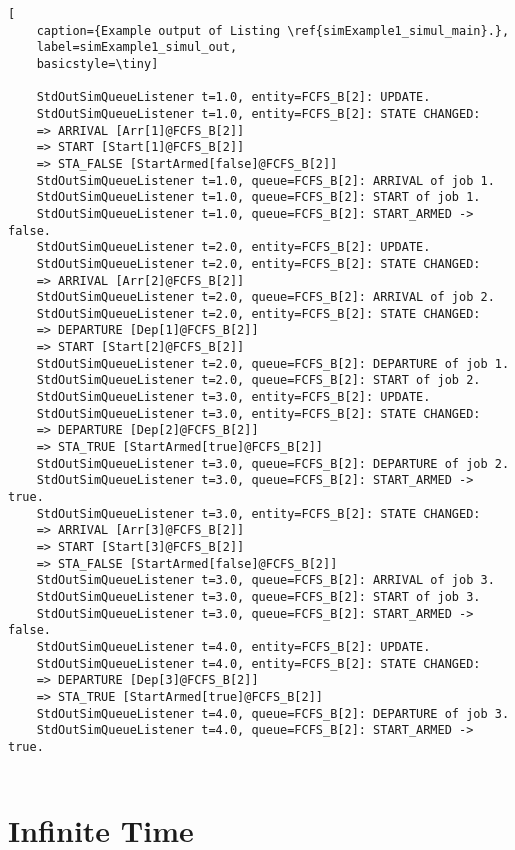 \begin{lstfloat}
	\begin{lstlisting}[
	caption={Example output of Listing \ref{simExample1_simul_main}.},
	label=simExample1_simul_out,
	basicstyle=\tiny]
	
	StdOutSimQueueListener t=1.0, entity=FCFS_B[2]: UPDATE.
	StdOutSimQueueListener t=1.0, entity=FCFS_B[2]: STATE CHANGED:
	=> ARRIVAL [Arr[1]@FCFS_B[2]]
	=> START [Start[1]@FCFS_B[2]]
	=> STA_FALSE [StartArmed[false]@FCFS_B[2]]
	StdOutSimQueueListener t=1.0, queue=FCFS_B[2]: ARRIVAL of job 1.
	StdOutSimQueueListener t=1.0, queue=FCFS_B[2]: START of job 1.
	StdOutSimQueueListener t=1.0, queue=FCFS_B[2]: START_ARMED -> false.
	StdOutSimQueueListener t=2.0, entity=FCFS_B[2]: UPDATE.
	StdOutSimQueueListener t=2.0, entity=FCFS_B[2]: STATE CHANGED:
	=> ARRIVAL [Arr[2]@FCFS_B[2]]
	StdOutSimQueueListener t=2.0, queue=FCFS_B[2]: ARRIVAL of job 2.
	StdOutSimQueueListener t=2.0, entity=FCFS_B[2]: STATE CHANGED:
	=> DEPARTURE [Dep[1]@FCFS_B[2]]
	=> START [Start[2]@FCFS_B[2]]
	StdOutSimQueueListener t=2.0, queue=FCFS_B[2]: DEPARTURE of job 1.
	StdOutSimQueueListener t=2.0, queue=FCFS_B[2]: START of job 2.
	StdOutSimQueueListener t=3.0, entity=FCFS_B[2]: UPDATE.
	StdOutSimQueueListener t=3.0, entity=FCFS_B[2]: STATE CHANGED:
	=> DEPARTURE [Dep[2]@FCFS_B[2]]
	=> STA_TRUE [StartArmed[true]@FCFS_B[2]]
	StdOutSimQueueListener t=3.0, queue=FCFS_B[2]: DEPARTURE of job 2.
	StdOutSimQueueListener t=3.0, queue=FCFS_B[2]: START_ARMED -> true.
	StdOutSimQueueListener t=3.0, entity=FCFS_B[2]: STATE CHANGED:
	=> ARRIVAL [Arr[3]@FCFS_B[2]]
	=> START [Start[3]@FCFS_B[2]]
	=> STA_FALSE [StartArmed[false]@FCFS_B[2]]
	StdOutSimQueueListener t=3.0, queue=FCFS_B[2]: ARRIVAL of job 3.
	StdOutSimQueueListener t=3.0, queue=FCFS_B[2]: START of job 3.
	StdOutSimQueueListener t=3.0, queue=FCFS_B[2]: START_ARMED -> false.
	StdOutSimQueueListener t=4.0, entity=FCFS_B[2]: UPDATE.
	StdOutSimQueueListener t=4.0, entity=FCFS_B[2]: STATE CHANGED:
	=> DEPARTURE [Dep[3]@FCFS_B[2]]
	=> STA_TRUE [StartArmed[true]@FCFS_B[2]]
	StdOutSimQueueListener t=4.0, queue=FCFS_B[2]: DEPARTURE of job 3.
	StdOutSimQueueListener t=4.0, queue=FCFS_B[2]: START_ARMED -> true.
	
	\end{lstlisting}
\end{lstfloat}

\section{Infinite Time}
\label{sec:infinite-time}


